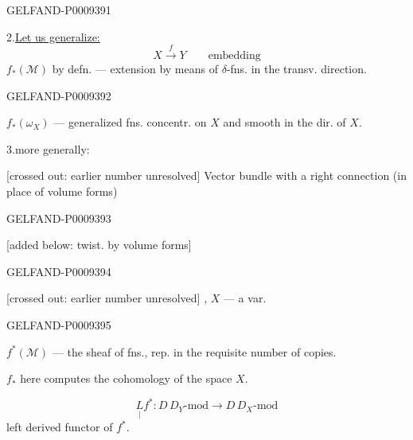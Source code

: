 \begin{GelfandAdjacentEvidence}{GELFAND-P000939}{1}

2.\enspace \underline{Let us generalize:}
\[
 X\overset f\longrightarrow Y\qquad\text{embedding}
\]
$f_*(\mathcal M)$ by defn. --- extension by means of $\delta$-fns. in the transv. direction.
\end{GelfandAdjacentEvidence}
\begin{GelfandAdjacentEvidence}{GELFAND-P000939}{2}


$f_*(\omega_X)$ --- generalized fns. concentr. on $X$ and smooth in the dir. of $X$.

3.\enspace more generally:

[crossed out: earlier number unresolved] Vector bundle with a right connection (in place of volume forms)
\end{GelfandAdjacentEvidence}
\begin{GelfandAdjacentEvidence}{GELFAND-P000939}{3}


[added below: twist. by volume forms]
\end{GelfandAdjacentEvidence}
\begin{GelfandAdjacentEvidence}{GELFAND-P000939}{4}



[crossed out: earlier number unresolved] , $X$ --- a var.
\end{GelfandAdjacentEvidence}
\begin{GelfandAdjacentEvidence}{GELFAND-P000939}{5}


$f^*(\mathcal M)$ --- the sheaf of fns., rep. in the requisite number of copies.

$f_*$ here computes the cohomology of the space $X$.

\begin{equation*}
 \underset{\vert}{L} f^*:D\,D_Y\text{-mod}\longrightarrow D\,D_X\text{-mod}
 \tag{11}
\end{equation*}
left derived functor of $f^*$.
\end{GelfandAdjacentEvidence}
